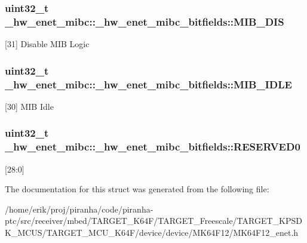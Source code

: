 \subsubsection[{\texorpdfstring{M\+I\+B\+\_\+\+D\+IS}{MIB_DIS}}]{\setlength{\rightskip}{0pt plus 5cm}uint32\+\_\+t \+\_\+hw\+\_\+enet\+\_\+mibc\+::\+\_\+hw\+\_\+enet\+\_\+mibc\+\_\+bitfields\+::\+M\+I\+B\+\_\+\+D\+IS}\hypertarget{struct__hw__enet__mibc_1_1__hw__enet__mibc__bitfields_a934c4c78490b6a9c7f9d5f6893407a18}{}\label{struct__hw__enet__mibc_1_1__hw__enet__mibc__bitfields_a934c4c78490b6a9c7f9d5f6893407a18}
\mbox{[}31\mbox{]} Disable M\+IB Logic 
\subsubsection[{\texorpdfstring{M\+I\+B\+\_\+\+I\+D\+LE}{MIB_IDLE}}]{\setlength{\rightskip}{0pt plus 5cm}uint32\+\_\+t \+\_\+hw\+\_\+enet\+\_\+mibc\+::\+\_\+hw\+\_\+enet\+\_\+mibc\+\_\+bitfields\+::\+M\+I\+B\+\_\+\+I\+D\+LE}\hypertarget{struct__hw__enet__mibc_1_1__hw__enet__mibc__bitfields_af661a210fc6b9cbf81be5a29db0580eb}{}\label{struct__hw__enet__mibc_1_1__hw__enet__mibc__bitfields_af661a210fc6b9cbf81be5a29db0580eb}
\mbox{[}30\mbox{]} M\+IB Idle 
\subsubsection[{\texorpdfstring{R\+E\+S\+E\+R\+V\+E\+D0}{RESERVED0}}]{\setlength{\rightskip}{0pt plus 5cm}uint32\+\_\+t \+\_\+hw\+\_\+enet\+\_\+mibc\+::\+\_\+hw\+\_\+enet\+\_\+mibc\+\_\+bitfields\+::\+R\+E\+S\+E\+R\+V\+E\+D0}\hypertarget{struct__hw__enet__mibc_1_1__hw__enet__mibc__bitfields_acad8accea2ffbfb0429248776514e657}{}\label{struct__hw__enet__mibc_1_1__hw__enet__mibc__bitfields_acad8accea2ffbfb0429248776514e657}
\mbox{[}28\+:0\mbox{]} 

The documentation for this struct was generated from the following file\+:\begin{DoxyCompactItemize}
\item 
/home/erik/proj/piranha/code/piranha-\/ptc/src/receiver/mbed/\+T\+A\+R\+G\+E\+T\+\_\+\+K64\+F/\+T\+A\+R\+G\+E\+T\+\_\+\+Freescale/\+T\+A\+R\+G\+E\+T\+\_\+\+K\+P\+S\+D\+K\+\_\+\+M\+C\+U\+S/\+T\+A\+R\+G\+E\+T\+\_\+\+M\+C\+U\+\_\+\+K64\+F/device/device/\+M\+K64\+F12/M\+K64\+F12\+\_\+enet.\+h\end{DoxyCompactItemize}
